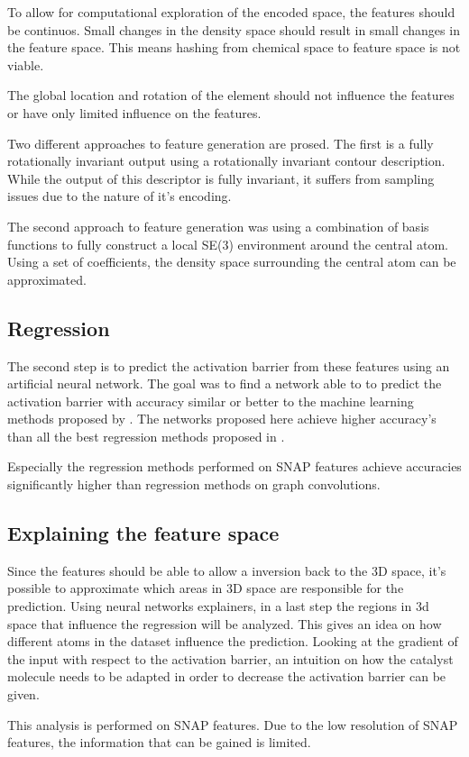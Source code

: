To allow for computational exploration of the encoded space, the features should be continuos.
Small changes in the density space should result in small changes in the 
feature space. 
This means hashing from chemical space to feature space is not viable.

The global location and rotation of the element should not influence the features or have only limited influence on the features.

Two different approaches to feature generation are prosed.
The first is a fully rotationally invariant output using a rotationally invariant contour description.
While the output of this descriptor is fully invariant, it suffers from sampling issues due to the nature of it's encoding.

The second approach to feature generation was using a combination of basis functions to fully construct a local SE(3) environment around the central atom.
Using a set of coefficients, the density space surrounding the central atom can be approximated.

\subsection{Regression}

The second step is to predict the activation barrier from these features using an artificial neural network.
The goal was to find a network able to to predict the activation barrier with accuracy similar or better to the machine learning methods proposed by \citeauthor{friederich_dos}.
The networks proposed here achieve higher accuracy's than all the best regression methods proposed in \cite{friederich_dos}.

Especially the regression methods performed on SNAP features achieve accuracies significantly higher than regression methods on graph convolutions.

\subsection{Explaining the feature space}
Since the features should be able to allow a inversion back to the 3D space, it's possible to approximate which areas in 3D space are responsible for the prediction.
Using neural networks explainers, in  a last step the regions in 3d space that influence the regression will be analyzed.
This gives an idea on how different atoms in the dataset influence the prediction.
Looking at the gradient of the input with respect to the activation barrier, an intuition on how the catalyst molecule needs to be 
adapted in order to decrease the activation barrier can be given.

This analysis is performed on SNAP features. 
Due to the low resolution of SNAP features, the information that can be gained is limited.